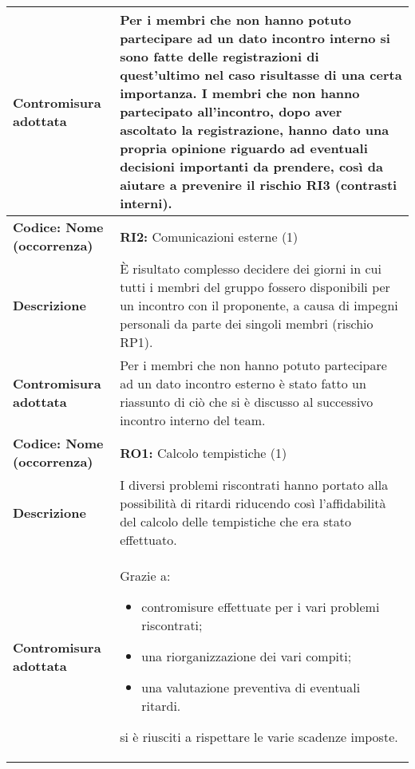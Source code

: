 {\begin{longtable}{C{3.5cm} | C{11cm}}
\textbf{Contromisura adottata} & Per i membri che non hanno potuto partecipare ad un dato incontro interno si sono fatte delle registrazioni di quest'ultimo nel caso risultasse di una certa importanza. I membri che non hanno partecipato all'incontro, dopo aver ascoltato la registrazione, hanno dato una propria opinione riguardo ad eventuali decisioni importanti da prendere, così da aiutare a prevenire il rischio RI3 (contrasti interni).\\
\hline
\hline
{}\textbf{Codice: Nome (occorrenza)} & \textbf{RI2: }{Comunicazioni esterne (1)}\\ 
\textbf{Descrizione} & È risultato complesso decidere dei giorni in cui tutti i membri del gruppo fossero disponibili per un incontro con il proponente, a causa di impegni personali da parte dei singoli membri (rischio RP1).\\ 
\textbf{Contromisura adottata} & Per i membri che non hanno potuto partecipare ad un dato incontro esterno è stato fatto un riassunto di ciò che si è discusso al successivo incontro interno del team.\\
\hline
\hline
{}\textbf{Codice: Nome (occorrenza)} & \textbf{RO1: }{Calcolo tempistiche (1)}\\
\textbf{Descrizione} & I diversi problemi riscontrati hanno portato alla possibilità di ritardi riducendo così l'affidabilità del calcolo delle tempistiche che era stato effettuato.\\
\textbf{Contromisura adottata} & Grazie a: 
\begin{itemize}
\item contromisure effettuate per i vari problemi riscontrati;
\item una riorganizzazione dei vari compiti;
\item una valutazione preventiva di eventuali ritardi.
\end{itemize} 
si è riusciti a rispettare le varie scadenze imposte.\\
\hline
\hline
\end{longtable}
}